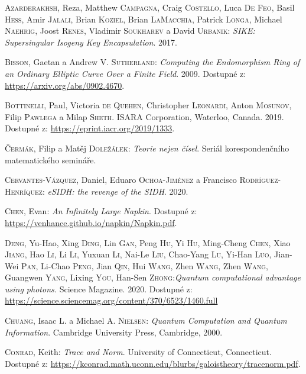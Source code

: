 \documentclass[12pt]{report}
\begin{document}
\begin{thebibliography}{97}

\textsc{Azarderakhsh}, Reza, Matthew \textsc{Campagna}, Craig \textsc{Costello}, Luca \textsc{De Feo}, Basil \textsc{Hess}, Amir \textsc{Jalali}, Brian \textsc{Koziel}, Brian \textsc{LaMacchia}, Patrick \textsc{Longa}, Michael \textsc{Naehrig}, Joost \textsc{Renes}, Vladimir \textsc{Soukharev} a David \textsc{Urbanik}: \textit{SIKE: Supersingular Isogeny Key Encapsulation}. 2017.

\textsc{Bisson}, Gaetan a Andrew V. \textsc{Sutherland}: \textit{Computing the Endomorphism Ring of an Ordinary Elliptic Curve Over a Finite Field}. 2009. Dostupné z: \url{https://arxiv.org/abs/0902.4670}.

\textsc{Bottinelli}, Paul, Victoria \textsc{de Quehen}, Christopher \textsc{Leonardi}, Anton \textsc{Mosunov}, Filip \textsc{Pawlega} a Milap \textsc{Sheth}. ISARA Corporation, Waterloo, Canada. 2019. Dostupné z: \url{https://eprint.iacr.org/2019/1333}.

\textsc{Čermák}, Filip a Matěj \textsc{Doležálek}: \textit{Teorie nejen čísel}. Seriál korespondenčního matematického semináře.

\textsc{Cervantes-Vázquez}, Daniel, Eduaro \textsc{Ochoa-Jiménez} a Francisco \textsc{Rodríguez-Henríquez}: \textit{eSIDH: the revenge of the SIDH}. 2020.

\textsc{Chen}, Evan: \textit{An Infinitely Large Napkin}. Dostupné z: \url{https://venhance.github.io/napkin/Napkin.pdf}.

\textsc{Deng}, Yu-Hao, Xing \textsc{Ding}, Lin \textsc{Gan}, Peng \textsc{Hu}, Yi \textsc{Hu}, Ming-Cheng \textsc{Chen}, Xiao \textsc{Jiang}, Hao \textsc{Li}, Li \textsc{Li}, Yuxuan \textsc{Li}, Nai-Le \textsc{Liu}, Chao-Yang \textsc{Lu}, Yi-Han \textsc{Luo}, Jian-Wei \textsc{Pan}, Li-Chao \textsc{Peng}, Jian \textsc{Qin}, Hui \textsc{Wang}, Zhen \textsc{Wang}, Zhen \textsc{Wang}, Guangwen \textsc{Yang}, Lixing \textsc{You}, Han-Sen \textsc{Zhong}:\textit{Quantum computational advantage using photons.} Science Magazine. 2020. Dostupné z: \url{https://science.sciencemag.org/content/370/6523/1460.full}

\textsc{Chuang}, Isaac L. a Michael A. \textsc{Nielsen}: \textit{Quantum Computation and Quantum Information}. Cambridge University Press, Cambridge, 2000. 

\textsc{Conrad}, Keith: \textit{Trace and Norm}. University of Connecticut, Connecticut. Dostupné z: \url{https://kconrad.math.uconn.edu/blurbs/galoistheory/tracenorm.pdf}.


\end{thebibliography}
\end{document}
